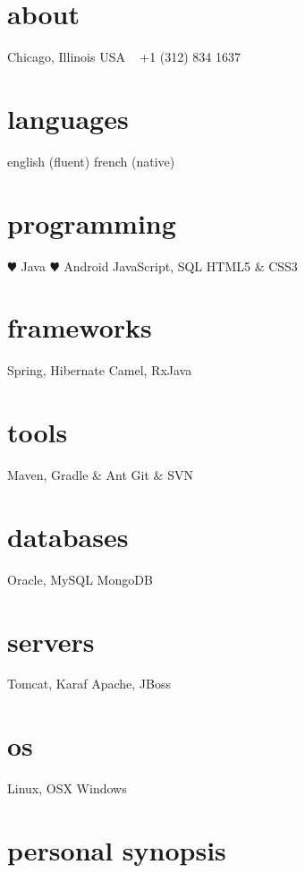 \documentclass[]{friggeri-cv} %
\begin{document}



\begin{aside} %
\section{about}
{\color{darkgray}Chicago, Illinois
USA
~
+1 (312) 834 1637
~
\section{languages}
english (fluent)
french (native)
\section{programming}
{\color{red} $\varheartsuit$} Java
{\color{red} $\varheartsuit$} Android
JavaScript, SQL
HTML5 \& CSS3
\section{frameworks}
Spring, Hibernate
Camel, RxJava
\section{tools}
Maven, Gradle \& Ant
Git \& SVN
\section{databases}
Oracle, MySQL
MongoDB}
\section{servers}
Tomcat, Karaf 
Apache, JBoss
\section{os}
Linux, OSX
Windows
\end{aside}

\section{personal synopsis}
\end{document}
